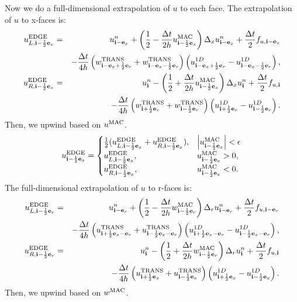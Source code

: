 \documentclass[11pt]{article}
\def\half  {\frac{1}{2}}
\def\dt    {\Delta t}
\def\edge  {\rm EDGE}
\def\mac   {\rm MAC}
\def\trans {\rm TRANS}
\def\eb    {{\bf e}}
\def\ib    {{\bf i}}
\begin{document}
Now we do a full-dimensional extrapolation of $u$ to each face.  The extrapolation of $u$ to x-faces is:
\begin{eqnarray}
u_{L,\ib-\half\eb_x}^{\edge} &=& u_{\ib-\eb_x}^n + \left(\half - \frac{\dt}{2h}u_{\ib-\half\eb_x}^{\mac}\right)\Delta_x u_{\ib-\eb_x}^n + \frac{\dt}{2}f_{u,\ib-\eb_x} \nonumber \\
&& - \frac{\dt}{4h}\left(w_{\ib-\eb_x+\half\eb_r}^{\trans}+w_{\ib-\eb_x-\half\eb_r}^{\trans}\right)\left(u_{\ib-\eb_x+\half\eb_r}^{1D} - u_{\ib-\eb_x-\half\eb_r}^{1D}\right), \\
u_{R,\ib-\half\eb_x}^{\edge} &=& u_{\ib}^n - \left(\half + \frac{\dt}{2h}u_{\ib-\half\eb_x}^{\mac}\right)\Delta_x u_{\ib}^n + \frac{\dt}{2}f_{u,\ib} \nonumber \\
&& - \frac{\dt}{4h}\left(w_{\ib+\half\eb_r}^{\trans}+w_{\ib-\half\eb_r}^{\trans}\right)\left(u_{\ib+\half\eb_r}^{1D} - u_{\ib-\half\eb_r}^{1D}\right).
\end{eqnarray}
Then, we upwind based on $u^{\mac}$.
\begin{equation}
u_{\ib-\half\eb_x}^{\edge} =
\begin{cases}
\half(u_{L,\ib-\half\eb_x}^{\edge} + u_{R,\ib-\half\eb_x}^{\edge}), & \left|u^{\mac}_{\ib-\half\eb_x}\right| < \epsilon \\
u_{L,\ib-\half\eb_x}^{\edge}, & u^{\mac}_{\ib-\half\eb_x} > 0, \\
u_{R,\ib-\half\eb_x}^{\edge}, & u^{\mac}_{\ib-\half\eb_x} < 0.
\end{cases}
\end{equation}
The full-dimensional extrapolation of $u$ to r-faces is:
\begin{eqnarray}
u_{L,\ib-\half\eb_r}^{\edge} &=& u_{\ib-\eb_r}^n + \left(\half - \frac{\dt}{2h}w_{\ib-\half\eb_r}^{\mac}\right)\Delta_r u_{\ib-\eb_r}^n + \frac{\dt}{2}f_{u,\ib-\eb_r} \nonumber \\
&& - \frac{\dt}{4h}\left(u_{\ib+\half\eb_x-\eb_r}^{\trans}+u_{\ib-\half\eb_x-\eb_r}^{\trans}\right)\left(u_{\ib+\half\eb_x-\eb_r}^{1D} - u_{\ib-\half\eb_x-\eb_r}^{1D}\right),  \\
u_{R,\ib-\half\eb_r}^{\edge} &=& u_{\ib}^n - \left(\half + \frac{\dt}{2h}w_{\ib-\half\eb_r}^{\mac}\right)\Delta_r u_{\ib}^n + \frac{\dt}{2}f_{u,\ib} \nonumber \\
&& - \frac{\dt}{4h}\left(u_{\ib+\half\eb_x}^{\trans}+u_{\ib-\half\eb_x}^{\trans}\right)\left(u_{\ib+\half\eb_x}^{1D} - u_{\ib-\half\eb_x}^{1D}\right). 
\end{eqnarray}
Then, we upwind based on $w^{\mac}$.
\end{document}
